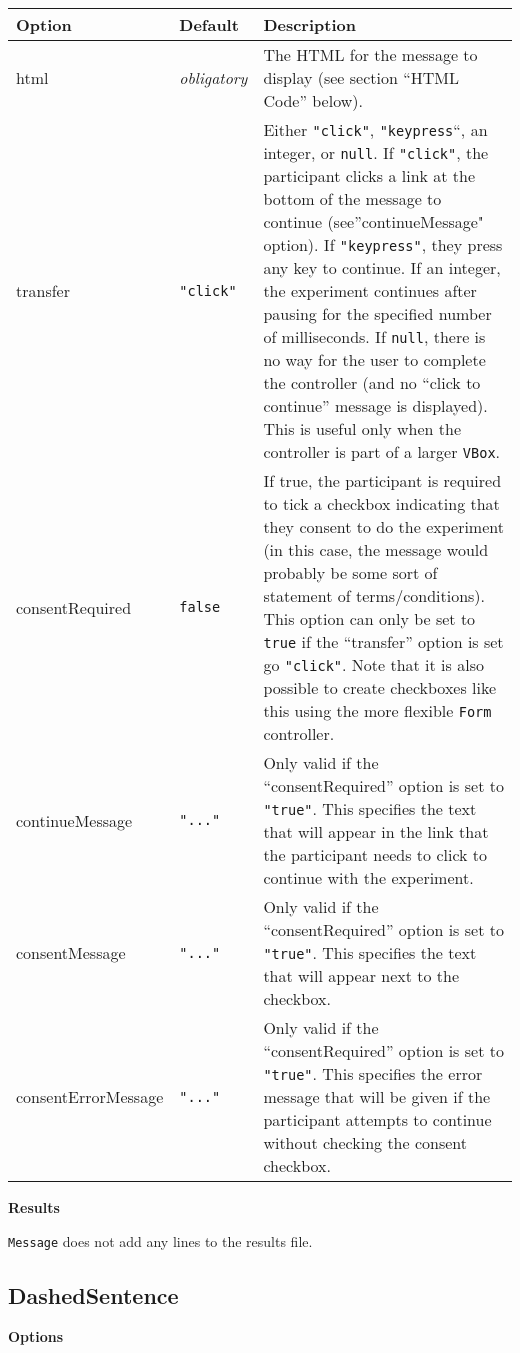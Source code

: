 \documentclass[]{article}
\begin{document}
\begin{longtable}[c]{p{1in}p{1in}p{3.85in}}
\toprule
\textbf{Option} & \textbf{Default} & \textbf{Description}\tabularnewline
\midrule
\endhead
html & \emph{obligatory} & The HTML for the message to display (see
section ``HTML Code'' below).\tabularnewline
transfer & \texttt{"click"} & Either \texttt{"click"},
\texttt{"keypress}``, an integer, or \texttt{null}. If \texttt{"click"},
the participant clicks a link at the bottom of the message to continue
(see''continueMessage" option). If \texttt{"keypress"}, they press any
key to continue. If an integer, the experiment continues after pausing
for the specified number of milliseconds. If \texttt{null}, there is no
way for the user to complete the controller (and no ``click to
continue'' message is displayed). This is useful only when the
controller is part of a larger \texttt{VBox}.\tabularnewline
consentRequired & \texttt{false} & If true, the participant is required
to tick a checkbox indicating that they consent to do the experiment (in
this case, the message would probably be some sort of statement of
terms/conditions). This option can only be set to \texttt{true} if the
``transfer'' option is set go \texttt{"click"}. Note that it is also
possible to create checkboxes like this using the more flexible
\texttt{Form} controller.\tabularnewline
continueMessage & \texttt{"..."} & Only valid if the ``consentRequired''
option is set to \texttt{"true"}. This specifies the text that will
appear in the link that the participant needs to click to continue with
the experiment.\tabularnewline
consentMessage & \texttt{"..."} & Only valid if the ``consentRequired''
option is set to \texttt{"true"}. This specifies the text that will
appear next to the checkbox.\tabularnewline
consentErrorMessage & \texttt{"..."} & Only valid if the
``consentRequired'' option is set to \texttt{"true"}. This specifies the
error message that will be given if the participant attempts to continue
without checking the consent checkbox.\tabularnewline
\bottomrule
\end{longtable}

\textbf{Results}

\texttt{Message} does not add any lines to the results file.

\subsection{DashedSentence}\label{dashedsentence}

\textbf{Options}
\end{document}
